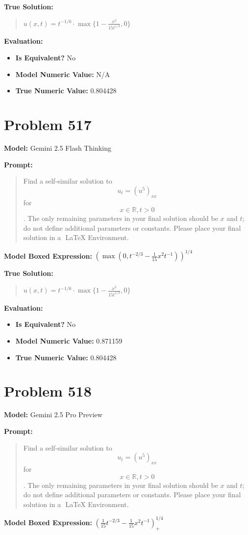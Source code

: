 \documentclass{article}
\begin{document}
\textbf{True Solution:}
\begin{quote}
$u(x,t)=t^{-1/6}\cdot\max\{1-\frac{x^2}{15t^{1/3}},0\}$
\end{quote}

\textbf{Evaluation:}
\begin{itemize}
\item \textbf{Is Equivalent?} No
\item \textbf{Model Numeric Value:} N/A
\item \textbf{True Numeric Value:} 0.804428
\end{itemize}
\vspace{1cm}
\section*{Problem 517}
\textbf{Model:} Gemini 2.5 Flash Thinking

\textbf{Prompt:}
\begin{quote}
Find a self-similar solution to $$u_t=(u^5)_{xx}$$ for $$x\in \mathbb{R}, t>0$$. The only remaining parameters in your final solution should be $x$ and $t$; do not define additional parameters or constants. Please place your final solution in a $\boxed{}$ LaTeX Environment.
\end{quote}
\textbf{Model Boxed Expression:} $ \left(\max\left(0, t^{-2/3} - \frac{1}{15}x^2t^{-1}\right)\right)^{1/4} $

\textbf{True Solution:}
\begin{quote}
$u(x,t)=t^{-1/6}\cdot\max\{1-\frac{x^2}{15t^{1/3}},0\}$
\end{quote}

\textbf{Evaluation:}
\begin{itemize}
\item \textbf{Is Equivalent?} No
\item \textbf{Model Numeric Value:} 0.871159
\item \textbf{True Numeric Value:} 0.804428
\end{itemize}
\vspace{1cm}
\section*{Problem 518}
\textbf{Model:} Gemini 2.5 Pro Preview

\textbf{Prompt:}
\begin{quote}
Find a self-similar solution to $$u_t=(u^5)_{xx}$$ for $$x\in \mathbb{R}, t>0$$. The only remaining parameters in your final solution should be $x$ and $t$; do not define additional parameters or constants. Please place your final solution in a $\boxed{}$ LaTeX Environment.
\end{quote}
\textbf{Model Boxed Expression:} $\left(\frac{1}{15}t^{-2/3} - \frac{1}{15}x^2t^{-1}\right)_+^{1/4}$
\end{document}
